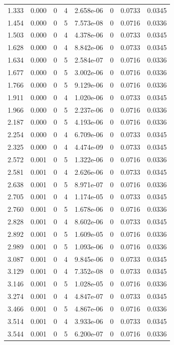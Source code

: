 \documentclass[preview]{standalone}
\begin{document}
{{\begin{tabular}{L{1.2cm}C{1.2cm} C{0.3cm}C{0.5cm} C{1.4cm}C{1.4cm} C{1.4cm}C{1.4cm}}
  1.333  &  0.000  & 0     &  4 &  2.658e-06  & 0  & 0.0733 &  0.0345   \\ 
  1.454  &  0.000  & 0     &  5 &  7.573e-08  & 0  & 0.0716 &  0.0336   \\ 
  1.503  &  0.000  & 0     &  4 &  4.378e-06  & 0  & 0.0733 &  0.0345   \\ 
  1.628  &  0.000  & 0     &  4 &  8.842e-06  & 0  & 0.0733 &  0.0345   \\ 
  1.634  &  0.000  & 0     &  5 &  2.584e-07  & 0  & 0.0716 &  0.0336   \\ 
  1.677  &  0.000  & 0     &  5 &  3.002e-06  & 0  & 0.0716 &  0.0336   \\ 
  1.766  &  0.000  & 0     &  5 &  9.129e-06  & 0  & 0.0716 &  0.0336   \\ 
  1.911  &  0.000  & 0     &  4 &  1.020e-06  & 0  & 0.0733 &  0.0345   \\ 
  1.966  &  0.000  & 0     &  5 &  2.237e-06  & 0  & 0.0716 &  0.0336   \\ 
  2.187  &  0.000  & 0     &  5 &  4.193e-06  & 0  & 0.0716 &  0.0336   \\ 
  2.254  &  0.000  & 0     &  4 &  6.709e-06  & 0  & 0.0733 &  0.0345   \\ 
  2.325  &  0.000  & 0     &  4 &  4.474e-09  & 0  & 0.0733 &  0.0345   \\ 
  2.572  &  0.001  & 0     &  5 &  1.322e-06  & 0  & 0.0716 &  0.0336   \\ 
  2.581  &  0.001  & 0     &  4 &  2.626e-06  & 0  & 0.0733 &  0.0345   \\ 
  2.638  &  0.001  & 0     &  5 &  8.971e-07  & 0  & 0.0716 &  0.0336   \\ 
  2.705  &  0.001  & 0     &  4 &  1.174e-05  & 0  & 0.0733 &  0.0345   \\ 
  2.760  &  0.001  & 0     &  5 &  1.678e-06  & 0  & 0.0716 &  0.0336   \\ 
  2.828  &  0.001  & 0     &  4 &  8.602e-06  & 0  & 0.0733 &  0.0345   \\ 
  2.892  &  0.001  & 0     &  5 &  1.609e-05  & 0  & 0.0716 &  0.0336   \\ 
  2.989  &  0.001  & 0     &  5 &  1.093e-06  & 0  & 0.0716 &  0.0336   \\ 
  3.087  &  0.001  & 0     &  4 &  9.845e-06  & 0  & 0.0733 &  0.0345   \\ 
  3.129  &  0.001  & 0     &  4 &  7.352e-08  & 0  & 0.0733 &  0.0345   \\ 
  3.146  &  0.001  & 0     &  5 &  1.028e-05  & 0  & 0.0716 &  0.0336   \\ 
  3.274  &  0.001  & 0     &  4 &  4.847e-07  & 0  & 0.0733 &  0.0345   \\ 
  3.466  &  0.001  & 0     &  5 &  4.867e-06  & 0  & 0.0716 &  0.0336   \\ 
  3.514  &  0.001  & 0     &  4 &  3.933e-06  & 0  & 0.0733 &  0.0345   \\ 
  3.544  &  0.001  & 0     &  5 &  6.200e-07  & 0  & 0.0716 &  0.0336   \\ 
\hline 
\end{tabular} 

}}
\end{document}
